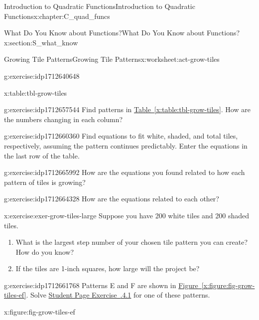 \documentclass[oneside,10pt,]{book}
\newcommand{\xreffont}{\relax}
\numberwithin{equation}{chapter}
\begin{document}
\begin{chapterptx}{Introduction to Quadratic Functions}{}{Introduction to Quadratic Functions}{}{}{x:chapter:C_quad_funcs}
\begin{sectionptx}{What Do You Know about Functions?}{}{What Do You Know about Functions?}{}{}{x:section:S_what_know}
\begin{worksheet-subsection}{Growing Tile Patterns}{}{Growing Tile Patterns}{}{}{x:worksheet:act-grow-tiles}
\begin{divisionexercise}{2}{}{}{g:exercise:idp1712640648}
\begin{tableptx}{\textbf{}}{x:table:tbl-grow-tiles}{}
{}%
\end{tableptx}%
\end{divisionexercise}%
\begin{divisionexercise}{3}{}{}{g:exercise:idp1712657544}%
Find patterns in \hyperref[x:table:tbl-grow-tiles]{Table~{\xreffont\ref{x:table:tbl-grow-tiles}}}. How are the numbers changing in each column?%
\end{divisionexercise}%
\begin{divisionexercise}{4}{}{}{g:exercise:idp1712660360}%
Find equations to fit white, shaded, and total tiles, respectively, assuming the pattern continues predictably. Enter the equations in the last row of the table.%
\end{divisionexercise}%
\begin{divisionexercise}{5}{}{}{g:exercise:idp1712665992}%
How are the equations you found related to how each pattern of tiles is growing?%
\end{divisionexercise}%
\begin{divisionexercise}{6}{}{}{g:exercise:idp1712664328}%
How are the equations related to each other?%
\end{divisionexercise}%
\begin{divisionexercise}{7}{}{}{x:exercise:exer-grow-tiles-large}%
Suppose you have 200 white tiles and 200 shaded tiles.%
\begin{enumerate}[font=\bfseries,label=(\alph*),ref=\alph*]
\item{}What is the largest step number of your chosen tile pattern you can create? How do you know?%
\item{}If the tiles are 1-inch squares, how large will the project be?%
\end{enumerate}
\end{divisionexercise}%
\begin{divisionexercise}{8}{}{}{g:exercise:idp1712661768}%
Patterns E and F are shown in \hyperref[x:figure:fig-grow-tiles-ef]{Figure~{\xreffont\ref{x:figure:fig-grow-tiles-ef}}}. Solve \hyperlink{x:exercise:exer-grow-tiles-study}{Student Page Exercise~{\xreffont 4.6.4.1}\textendash{}{\xreffont 4.6.4.7}} for one of these patterns.%
\begin{figureptx}{}{x:figure:fig-grow-tiles-ef}{}%
\begin{image}{0.05}{0.9}{0.05}%

\end{image}
\end{figureptx}
\end{divisionexercise}
\end{worksheet-subsection}
\end{sectionptx}
\end{chapterptx}
\end{document}
